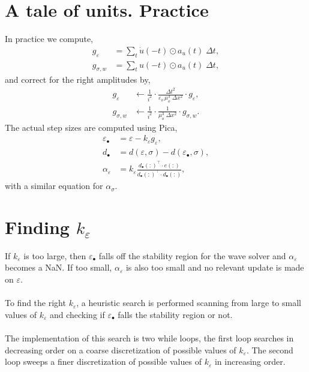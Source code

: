 \documentclass[a4paper,12pt]{article}
\begin{document}
\section*{A tale of units. Practice}
In practice we compute,
\begin{align*}
g_{\varepsilon} &= \sum_t \dot{u}(-t)\odot a_u(t) \; \Delta t, \\
g_{\sigma,w} &= \sum_t u(-t)\odot a_u(t) \; \Delta t,
\end{align*}
and correct for the right amplitudes by,
\begin{align*}
g_{\varepsilon} &\gets \frac{1}{i^2} \cdot \frac{\Delta t^2}{\varepsilon_o\,\mu_o^3\; \Delta x^2 } \cdot g_{\varepsilon}, \\
g_{\sigma,w} &\gets \frac{1}{i^2} \cdot \frac{1}{\mu_o^3\; \Delta x^2} \cdot g_{\sigma,w}.
\end{align*}
The actual step sizes are computed using Pica,
\begin{align*}
\varepsilon_\bullet &= \varepsilon-k_\varepsilon g_\varepsilon, \\
d_\bullet &= d(\varepsilon,\sigma)-d(\varepsilon_\bullet,\sigma), \\
\alpha_\varepsilon &= k_\varepsilon \frac{d_\bullet(:)^\top \cdot e(:)}{d_\bullet(:)^\top \cdot d_\bullet(:)},
\end{align*}
with a similar equation for $\alpha_\sigma$.
\section*{Finding $k_\varepsilon$}
If $k_\varepsilon$ is too large, then $\varepsilon_\bullet$ falls off the stability region for the wave solver and $\alpha_\varepsilon$ becomes a NaN. If too small, $\alpha_\varepsilon$ is also too small and no relevant update is made on $\varepsilon$.
\\\\
To find the right $k_\varepsilon$, a heuristic search is performed scanning from large to small values of $k_\varepsilon$ and checking if $\varepsilon_\bullet$ falls the stability region or not.
\\\\
The implementation of this search is two while loops, the first loop searches in decreasing order on a coarse discretization of possible values of $k_\varepsilon$. The second loop sweeps a finer discretization of possible values of $k_\varepsilon$ in increasing order.
\end{document}
